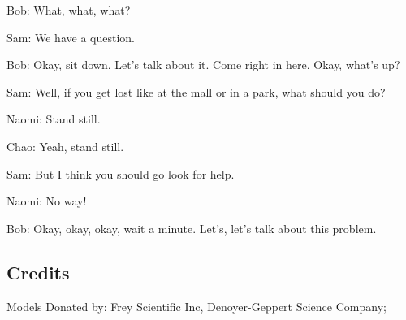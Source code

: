 Bob: What, what, what?

Sam: We have a question.

Bob: Okay, sit down. Let's talk about it. Come right in here. Okay, what's up?

Sam: Well, if you get lost like at the mall or in a park, what should you do?

Naomi: Stand still.

Chao: Yeah, stand still.

Sam: But I think you should go look for help.

Naomi: No way!

Bob: Okay, okay, okay, wait a minute. Let's, let's talk about this problem.

\subsection{Credits}

Models Donated by: Frey Scientific Inc, Denoyer-Geppert Science Company;